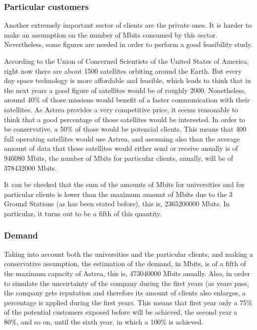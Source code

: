 \subsubsection{Particular customers}
Another extremely important sector of clients are the private ones. It is harder to make an assumption on the number of Mbits consumed by this sector. Nevertheless, some figures are needed in order to perform a good feasibility study. 

According to the Union of Concerned Scientists of the United States of America, right now there are about 1500 satellites orbiting around the Earth. But every day space technology is more affordable and feasible, which leads to think that in the next years a good figure of satellites would be of roughly 2000. Nonetheless, around 40\% of those missions would benefit of a faster communication with their satellites. As Astrea provides a very competitive price, it seems reasonable to think that a good percentage of those satellites would be interested. In order to be conservative, a 50\% of those would be potencial clients. This means that 400 full operating satellites would use Astrea, and assuming also than the average amount of data that those satellites would either send or receive anually is of 946080 Mbits, the number of Mbits for particular clients, anually, will be of 378432000 Mbits.

It can be checked that the sum of the amounts of Mbits for universities and for particular clients is lower than the maximum amount of Mbits due to the 3 Ground Stations (as has been stated before), this is, 2365200000 Mbits. In particular, it turns out to be a fifth of this quantity. 

\subsubsection{Demand}
Taking into account both the universities and the particular clients, and making a conservative assumption, the estimation of the demand, in Mbits, is of a fifth of the maximum capacity of Astrea, this is, 473040000 Mbits anually. Also, in order to simulate the unceirtainty of the company during the first years (as years pass, the company gets reputation and therefore its amount of clients also enlarges, a percentage is applied during the first years. This means that first year only a 75\% of the potential customers exposed before will be achieved, the second year a 80\%, and so on, until the sixth year, in which a 100\% is achieved. 

